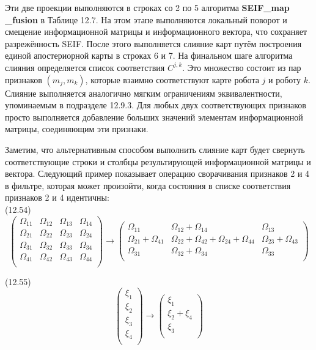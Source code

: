 \documentclass[10pt,a4paper]{article}
\begin{document}
Эти две проекции выполняются в строках со 2 по 5 алгоритма \textbf{SEIF\_map \_fusion} в Таблице 12.7. На этом этапе выполняются локальный поворот и смещение информационной матрицы и информационного вектора, что сохраняет разрежённость SEIF. После этого выполняется слияние карт путём построения единой апостериорной карты в строках 6 и 7. На финальном шаге алгоритма слияния определяется список соответствия $C^{j,k}$. Это множество состоит из пар признаков $(m_j, m_k)$, которые взаимно соответствуют карте робота $j$ и роботу $k$. Слияние выполняется аналогично мягким ограничениям эквивалентности, упоминаемым в подразделе 12.9.3. Для любых двух соответствующих признаков просто выполняется добавление больших значений элементам информационной матрицы, соединяющим эти признаки.

Заметим, что альтернативным способом выполнить слияние карт будет свернуть соответствующие строки и столбцы результирующей информационной матрицы и вектора. Следующий пример показывает операцию сворачивания признаков 2 и 4 в фильтре, которая может произойти, когда состояния в списке соответствия признаков 2 и 4 идентичны:\\

(12.54)
$$\left(\begin{array}{cccc}\varOmega_{11}&\varOmega_{12}&\varOmega_{13}&\varOmega_{14}\\
\varOmega_{21}&\varOmega_{22}&\varOmega_{23}&\varOmega_{24}\\
\varOmega_{31}&\varOmega_{32}&\varOmega_{33}&\varOmega_{34}\\
\varOmega_{41}&\varOmega_{42}&\varOmega_{43}&\varOmega_{44}\\\end{array}\right)\longrightarrow\left(\begin{array}{ccc}\varOmega_{11}&\varOmega_{12}+\varOmega_{14}&\varOmega_{13}\\\varOmega_{21}+\varOmega_{41}&\varOmega_{22}+\varOmega_{42}+\varOmega_{24}+\varOmega_{44}&\varOmega_{23}+\varOmega_{43}\\\varOmega_{31}&\varOmega_{32}+\varOmega_{34}&\varOmega_{33}\\\end{array}\right)$$

(12.55)
$$\left(\begin{array}{c}\xi_1\\\xi_2\\\xi_3\\\xi_4\\\end{array}\right)\longrightarrow\left(\begin{array}{c}\xi_1\\\xi_2+\xi_4\\\xi_3\\\end{array}\right)$$
\end{document}
